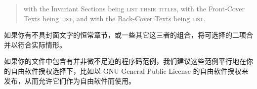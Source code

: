 \bigskip
\begin{quote}
    with the Invariant Sections being \textsc{list their titles}, with the Front-Cover Texts being \textsc{list}, and with the Back-Cover Texts being \textsc{list}.
\end{quote}
\bigskip


如果你有不具封面文字的恒常章节，或一些其它这三者的组合，将可选择的二项合并以符合实际情形。


如果你的文件中包含有并非微不足道的程序码范例，我们建议这些范例平行地在你的自由软件授权选择下，比如以 GNU General Public License 的自由软件授权来发布，从而允许它们作为自由软件而使用。

\clearpage

